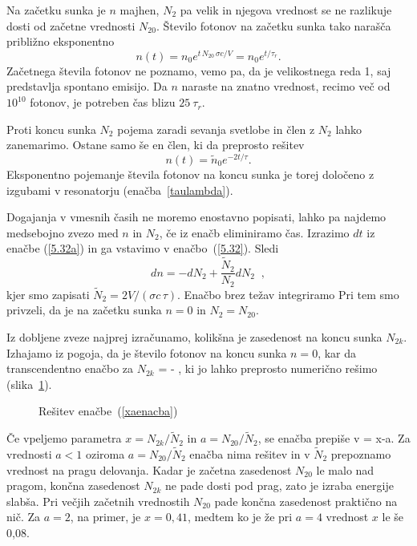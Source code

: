 Na začetku sunka je $n$ majhen, $N_2$ pa velik in njegova vrednost
se ne razlikuje dosti od začetne vrednosti $N_{20}$. Število fotonov
na začetku sunka tako narašča približno eksponentno
\begin{equation}  
n(t)=n_0e^{t\,N_{20}\,\sigma c/V}= n_0e^{t/\tau_r}.
\label{5.33}
\end{equation}
Začetnega števila fotonov ne poznamo, vemo pa, da je velikostnega reda 1,
saj predstavlja spontano emisijo. Da $n$ naraste na znatno
vrednost, recimo več od $10^{10}$ fotonov, je potreben čas blizu $25~\tau_r$.

Proti koncu sunka $N_2$ pojema zaradi sevanja svetlobe in člen z $N_2$ lahko 
zanemarimo. Ostane samo še en člen, ki da preprosto rešitev
\begin{equation}  
n(t)=\tilde{n}_0e^{-2t/\tau}.
\label{5.33a}
\end{equation}
Eksponentno pojemanje števila fotonov na koncu sunka je torej določeno z izgubami
v resonatorju (enačba~\ref{taulambda}). 

Dogajanja v vmesnih časih ne moremo enostavno popisati, lahko pa najdemo
medsebojno zvezo med $n$ in $N_2$, če iz enačb eliminiramo čas. 
Izrazimo $dt$ iz enačbe (\ref{5.32a}) in ga vstavimo v enačbo~(\ref{5.32}).
Sledi
\begin{equation}
dn=-dN_{2}+\frac{\tilde{N}_2}{N_{2}}dN_{2}\;\;,  \label{5.341}
\end{equation}
kjer smo zapisati $\tilde{N}_{2}=2V/(\sigma c\,\tau)$.
Enačbo brez težav integriramo
Pri tem smo privzeli, da je na začetku sunka $n=0$ in $N_{2}=N_{20}$. 

Iz dobljene zveze najprej izračunamo, kolikšna je zasedenost na koncu sunka 
$N_{2k}$. Izhajamo iz pogoja, da je število fotonov na koncu sunka $n=0$, 
kar da transcendentno enačbo za $N_{2k}$
\beq
\ln {} = - ,
\label{xaenacba}
\eeq
ki jo lahko preprosto numerično rešimo (slika~\ref{fig:Qeq}).
\begin{figure}[h]
\centering
\def\svgwidth{100truemm} 

\caption{Rešitev enačbe~(\ref{xaenacba})}
\label{fig:Qeq}
\end{figure}

Če vpeljemo parametra $x=N_{2k}/\tilde{N}_2$ in $a=N_{20}/\tilde{N}_{2}$, se
enačba prepiše v 
\beq
\ln {}= x-a.
\eeq
Za vrednosti $a<1$ oziroma $a=N_{20}/\tilde{N}_{2}$ enačba nima rešitev in 
v $\tilde{N}_{2}$ prepoznamo vrednost na pragu delovanja. Kadar je začetna 
zasedenost $N_{20}$ le malo nad pragom, končna zasedenost $N_{2k}$ ne pade 
dosti pod prag, zato je izraba energije slabša. Pri večjih začetnih vrednostih 
$N_{20}$ pade končna zasedenost praktično na nič. Za $a=2$, na primer,
je $x=0,41$, medtem ko je že pri $a=4$ vrednost $x$ le še 0,08. 

